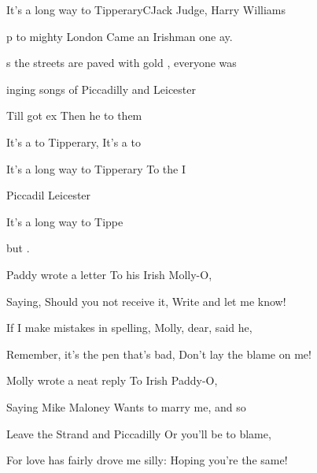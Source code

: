 \begin{song}{It's a long way to Tipperary}{C}{Jack Judge, Harry Williams}

\begin{SBVerse}

p to mighty London Came an Irishman one ay.

s the streets are paved with gold , everyone was 

inging songs of Piccadilly  and Leicester 

Till  got ex Then he  to them 
\end{SBVerse}

\begin{SBChorus}
It's a  to Tipperary, It's a  to 

It's a long way to Tipperary To the   I 

 Piccadil  Leicester 

It's a  long way to Tippe

but   .
\end{SBChorus}

\begin{SBVerse}

Paddy wrote a letter To his Irish Molly-O,

Saying, Should you not receive it, Write and let me know!

If I make mistakes in spelling, Molly, dear, said he,

Remember, it's the pen that's bad, Don't lay the blame on me!

\end{SBVerse}

\begin{SBVerse}

Molly wrote a neat reply To Irish Paddy-O,

Saying Mike Maloney Wants to marry me, and so

Leave the Strand and Piccadilly Or you'll be to blame,

For love has fairly drove me silly: Hoping you're the same!

\end{SBVerse}
\end{song}

\pagebreak
